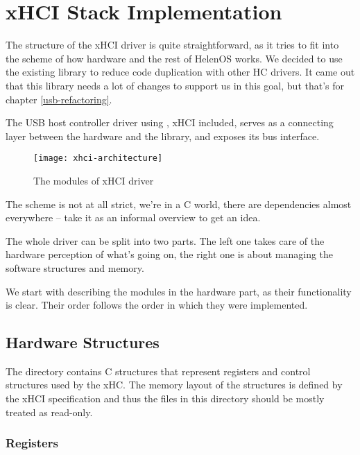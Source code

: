 \chapter{xHCI Stack Implementation}

The structure of the xHCI driver is quite straightforward, as it tries to fit
into the scheme of how hardware and the rest of HelenOS works. We decided to
use the existing library  to reduce code duplication with
other HC drivers. It came out that this library needs a lot of changes to
support us in this goal, but that's for chapter \ref{usb-refactoring}.

The USB host controller driver using , xHCI included, serves as
a connecting layer between the hardware and the library, and exposes its bus
interface.

\begin{figure}[h]
	\centering
	\texttt{[image: xhci-architecture]}
	\caption{The modules of xHCI driver}
\end{figure}

The scheme is not at all strict, we're in a C world, there are dependencies
almost everywhere -- take it as an informal overview to get an idea.

The whole driver can be split into two parts. The left one takes care of the
hardware perception of what's going on, the right one is about managing the
software structures and memory.

We start with describing the modules in the hardware part, as their
functionality is clear. Their order follows the order in which they were
implemented.

\section{Hardware Structures}

The  directory contains C structures
that represent registers and control structures used by the xHC. The memory layout of the
structures is defined by the xHCI specification\cite{xhci} and thus the files in this directory should
be mostly treated as read-only.

\subsection{Registers}

